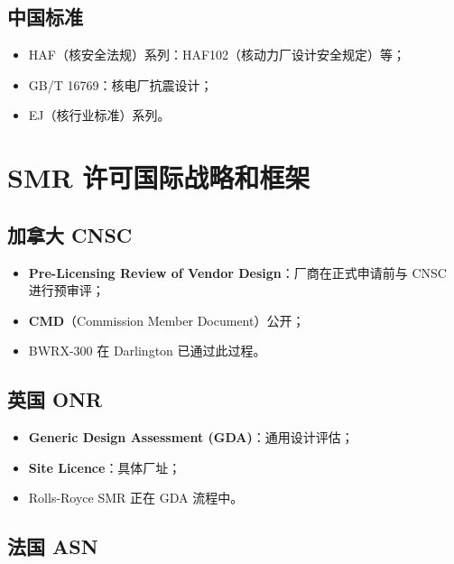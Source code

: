 \documentclass[
  UTF8,
  scheme=plain,
  fontsize=10pt,
  openany
]{ctexbook}
\begin{document}
\subsection{中国标准}\label{ux4e2dux56fdux6807ux51c6}

\begin{itemize}
\tightlist
\item
  HAF（核安全法规）系列：HAF102（核动力厂设计安全规定）等；
\item
  GB/T 16769：核电厂抗震设计；
\item
  EJ（核行业标准）系列。
\end{itemize}

\section{SMR
许可国际战略和框架}\label{smr-ux8bb8ux53efux56fdux9645ux6218ux7565ux548cux6846ux67b6}

\subsection{加拿大 CNSC}\label{ux52a0ux62ffux5927-cnsc}

\begin{itemize}
\tightlist
\item
  \textbf{Pre-Licensing Review of Vendor Design}：厂商在正式申请前与
  CNSC 进行预审评；
\item
  \textbf{CMD}（Commission Member Document）公开；
\item
  BWRX-300 在 Darlington 已通过此过程。
\end{itemize}

\subsection{英国 ONR}\label{ux82f1ux56fd-onr}

\begin{itemize}
\tightlist
\item
  \textbf{Generic Design Assessment (GDA)}：通用设计评估；
\item
  \textbf{Site Licence}：具体厂址；
\item
  Rolls-Royce SMR 正在 GDA 流程中。
\end{itemize}

\subsection{法国 ASN}\label{ux6cd5ux56fd-asn}
\end{document}
